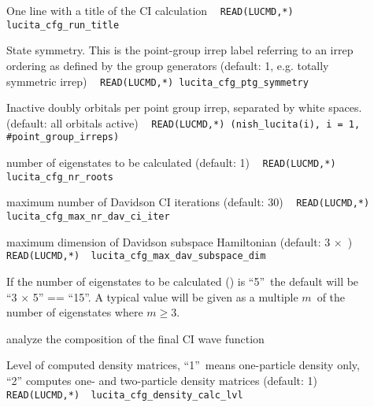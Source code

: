 \begin{description}
\item[] One line with a title of the CI calculation \verb| |\newline
\verb|READ(LUCMD,*) lucita_cfg_run_title |

\item[] State symmetry. This is the point-group irrep label 
referring to an irrep ordering as defined by the group generators (default: 1, e.g. totally symmetric irrep)  \verb| |\newline
\verb|READ(LUCMD,*) lucita_cfg_ptg_symmetry |

\item[] Inactive doubly orbitals per point group irrep, 
separated by white spaces. (default: all orbitals active) \verb| |\newline
\verb|READ(LUCMD,*) (nish_lucita(i), i = 1, #point_group_irreps) |

\item[] number of eigenstates to be calculated (default: 1) \verb| |\newline
\verb|READ(LUCMD,*) lucita_cfg_nr_roots |

\item[] maximum number of Davidson CI iterations (default: 30) \verb| |\newline
\verb|READ(LUCMD,*) lucita_cfg_max_nr_dav_ci_iter |

\item[] maximum dimension of Davidson subspace Hamiltonian (default: 3 $\times$\ )\newline
\verb|READ(LUCMD,*)  lucita_cfg_max_dav_subspace_dim|

If the number of eigenstates to be calculated () is ``5''\ 
the default will be\\ ``3 $\times$ 5'' == ``15''. A typical value will 
be given as a multiple $m$\ of the number of eigenstates where $m \geq 3$.

\item[] analyze the composition of the final CI wave function \newline

\item[]  Level of computed density matrices, ``1''\ means one-particle density only, ``2'' computes one- and two-particle density matrices (default: 1) \verb| |\newline
\verb|READ(LUCMD,*)  lucita_cfg_density_calc_lvl |


\end{description}
